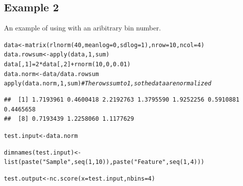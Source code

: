 \documentclass{article}\usepackage[]{graphicx}\usepackage[usenames,dvipsnames]{color}
\newcommand{\hlnum}[1]{\textcolor[rgb]{0.816,0.125,0.439}{#1}}%
\newcommand{\hlstr}[1]{\textcolor[rgb]{0.251,0.627,0.251}{#1}}%
\newcommand{\hlcom}[1]{\textcolor[rgb]{0.502,0.502,0.502}{\textit{#1}}}%
\newcommand{\hlopt}[1]{\textcolor[rgb]{0,0,0}{#1}}%
\newcommand{\hlstd}[1]{\textcolor[rgb]{0.251,0.251,0.251}{#1}}%
\newcommand{\hlkwb}[1]{\textcolor[rgb]{0,0,0}{#1}}%
\newcommand{\hlkwc}[1]{\textcolor[rgb]{0.251,0.251,0.251}{#1}}%
\newcommand{\hlkwd}[1]{\textcolor[rgb]{0.878,0.439,0.125}{#1}}%
\newenvironment{knitrout}{}{} %
\begin{document}
\subsection{Example 2}

An example of using  with an aribitrary bin number.

\begin{knitrout}
\color{fgcolor}\begin{kframe}
\begin{alltt}
\hlstd{data} \hlkwb{<-} \hlkwd{matrix}\hlstd{(}\hlkwd{rlnorm}\hlstd{(}\hlnum{40}\hlstd{,}\hlkwc{meanlog}\hlstd{=}\hlnum{0}\hlstd{,}\hlkwc{sdlog}\hlstd{=}\hlnum{1}\hlstd{),}\hlkwc{nrow}\hlstd{=}\hlnum{10}\hlstd{,}\hlkwc{ncol}\hlstd{=}\hlnum{4}\hlstd{)}
\hlstd{data.rowsum} \hlkwb{<-} \hlkwd{apply}\hlstd{(data,}\hlnum{1}\hlstd{,sum)}
\hlstd{data[,}\hlnum{1}\hlstd{]} \hlkwb{=} \hlnum{2}\hlopt{*}\hlstd{data[,}\hlnum{2}\hlstd{]} \hlopt{+} \hlkwd{rnorm}\hlstd{(}\hlnum{10}\hlstd{,}\hlnum{0}\hlstd{,}\hlnum{0.01}\hlstd{)}
\hlstd{data.norm} \hlkwb{<-} \hlstd{data}\hlopt{/}\hlstd{data.rowsum}
\hlkwd{apply}\hlstd{(data.norm,}\hlnum{1}\hlstd{,sum)}  \hlcom{# The rows sum to 1, so the data are normalized}
\end{alltt}
\begin{verbatim}
##  [1] 1.7193961 0.4600418 2.2192763 1.3795590 1.9252256 0.5910881 0.4465658
##  [8] 0.7193439 1.2258060 1.1177629
\end{verbatim}
\begin{alltt}
\hlstd{test.input} \hlkwb{<-} \hlstd{data.norm}

\hlkwd{dimnames}\hlstd{(test.input)} \hlkwb{<-} \hlkwd{list}\hlstd{(}\hlkwd{paste}\hlstd{(}\hlstr{"Sample"}\hlstd{,}\hlkwd{seq}\hlstd{(}\hlnum{1}\hlstd{,}\hlnum{10}\hlstd{)),}\hlkwd{paste}\hlstd{(}\hlstr{"Feature"}\hlstd{,}\hlkwd{seq}\hlstd{(}\hlnum{1}\hlstd{,}\hlnum{4}\hlstd{)))}

\hlstd{test.output} \hlkwb{<-} \hlkwd{nc.score}\hlstd{(}\hlkwc{x}\hlstd{=test.input,}\hlkwc{nbins}\hlstd{=}\hlnum{4}\hlstd{)}
\end{alltt}
\end{kframe}
\end{knitrout}
\end{document}
